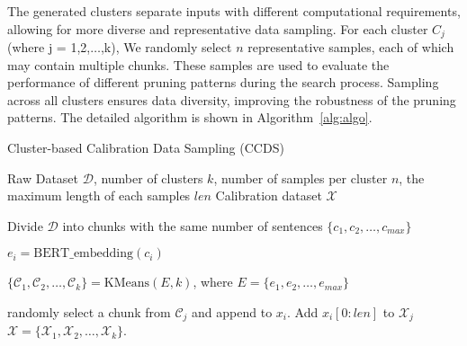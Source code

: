 The generated clusters separate inputs with different computational requirements, allowing for more diverse and representative data sampling.
For each cluster $C_j$ (where j = 1,2,$\dots$,k), We randomly select $n$ representative samples, each of which may contain multiple chunks.
These samples are used to evaluate the performance of different pruning patterns during the search process. 
Sampling across all clusters ensures data diversity, 
improving the robustness of the pruning patterns.
The detailed algorithm is shown in Algorithm~\ref{alg:algo}.

\begin{algorithm}[t]
\caption{Cluster-based Calibration Data Sampling (CCDS)}
\label{alg:algo}
\begin{algorithmic}[1]

\REQUIRE Raw Dataset \( \mathcal{D} \), number of clusters \( k \), number of samples per cluster \( n \), the maximum length of each samples \(len\)
\ENSURE Calibration dataset \( \mathcal{X}\)

\STATE Divide \( \mathcal{D} \) into chunks with the same number of sentences \(\{c_1,c_2,\dots,c_{max}\}\)

    \STATE \(e_i = \text{BERT\_embedding}(c_i) \)
\ENDFOR

\STATE \( \{\mathcal{C}_1, \mathcal{C}_2, \dots, \mathcal{C}_k\} = \text{KMeans}(E,k)\), where \(E=\{e_1,e_2,\dots,e_{max}\}\)


        \STATE randomly select a chunk from \( \mathcal{C}_j \) and append to \(x_i\).
    \ENDWHILE
    \STATE Add \(x_i[0:len]\) to \(\mathcal{X}_j\)
    \ENDFOR
\ENDFOR
\RETURN \( \mathcal{X} = \{\mathcal{X}_1,\mathcal{X}_2,\dots,\mathcal{X}_k\}\).

\end{algorithmic}
\end{algorithm}

